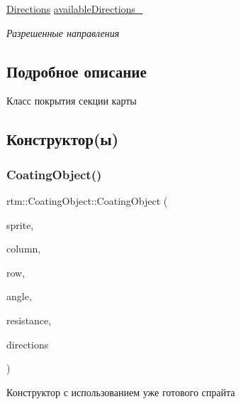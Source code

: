 \begin{DoxyCompactItemize}
\mbox{\label{classrtm_1_1_coating_object_ad542a00f5a714fee4f8ebc30e76746cc}} 
\hyperlink{namespacertm_a4776fbfe59834ff1a16838ad6735b69a}{Directions} \hyperlink{classrtm_1_1_coating_object_ad542a00f5a714fee4f8ebc30e76746cc}{available\+Directions\+\_\+}
\begin{DoxyCompactList}\small\item\em Разрешенные направления \end{DoxyCompactList}\end{DoxyCompactItemize}


\subsection{Подробное описание}
Класс покрытия секции карты 

\subsection{Конструктор(ы)}
\mbox{\label{classrtm_1_1_coating_object_a4d5d7ecc1ba34ec9f2d29dd39c1c054f}} 
\subsubsection{\texorpdfstring{Coating\+Object()}{CoatingObject()}\hspace{0.1cm}{\footnotesize\ttfamily [1/2]}}
{\footnotesize\ttfamily rtm\+::\+Coating\+Object\+::\+Coating\+Object (\begin{DoxyParamCaption}\item[{cocos2d\+::\+Sprite $\ast$const}]{sprite,  }\item[{int}]{column,  }\item[{int}]{row,  }\item[{\hyperlink{namespacertm_a69dc82b16a0148c10962caa83d930f89}{Angle\+Type}}]{angle,  }\item[{float}]{resistance,  }\item[{\hyperlink{namespacertm_a4776fbfe59834ff1a16838ad6735b69a}{Directions}}]{directions }\end{DoxyParamCaption})}



Конструктор с использованием уже готового спрайта 


